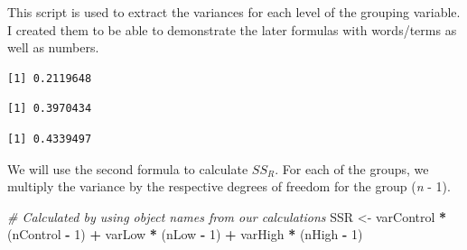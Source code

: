 \documentclass[
  11pt,
]{book}
\newenvironment{Shaded}{\begin{snugshade}}{\end{snugshade}}
\newcommand{\CommentTok}[1]{\textcolor[rgb]{0.37,0.37,0.37}{\textit{#1}}}
\newcommand{\DecValTok}[1]{\textcolor[rgb]{0.06,0.06,0.06}{#1}}
\newcommand{\NormalTok}[1]{#1}
\newcommand{\OtherTok}[1]{\textcolor[rgb]{0.37,0.37,0.37}{#1}}
\newcommand{\SpecialCharTok}[1]{\textcolor[rgb]{0.43,0.43,0.43}{\textbf{#1}}}
\begin{document}
This script is used to extract the variances for each level of the grouping variable. I created them to be able to demonstrate the later formulas with words/terms as well as numbers.

\begin{Shaded}
\end{Shaded}

\begin{verbatim}
[1] 0.2119648
\end{verbatim}

\begin{Shaded}
\end{Shaded}

\begin{verbatim}
[1] 0.3970434
\end{verbatim}

\begin{Shaded}
\end{Shaded}

\begin{verbatim}
[1] 0.4339497
\end{verbatim}

We will use the second formula to calculate \(SS_R\). For each of the groups, we multiply the variance by the respective degrees of freedom for the group (\emph{n} - 1).

\begin{Shaded}
\begin{Highlighting}[]
\CommentTok{\# Calculated by using object names from our calculations}
\NormalTok{SSR }\OtherTok{\textless{}{-}}\NormalTok{ varControl }\SpecialCharTok{*}\NormalTok{ (nControl }\SpecialCharTok{{-}} \DecValTok{1}\NormalTok{) }\SpecialCharTok{+}\NormalTok{ varLow }\SpecialCharTok{*}\NormalTok{ (nLow }\SpecialCharTok{{-}} \DecValTok{1}\NormalTok{) }\SpecialCharTok{+}\NormalTok{ varHigh }\SpecialCharTok{*}\NormalTok{ (nHigh }\SpecialCharTok{{-}}
    \DecValTok{1}\NormalTok{)}
\end{Highlighting}
\end{Shaded}
\end{document}
